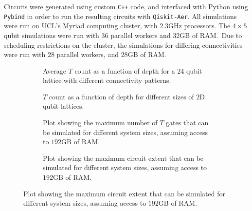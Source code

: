 Circuits were generated using custom \texttt{C++} code, and interfaced with Python using \texttt{Pybind} in order to run the resulting circuits with \texttt{Qiskit-Aer}. All simulations were run on UCL's Myriad computing cluster, with $2.3\mathrm{GHz}$ processors. The $4\times5$ qubit simulations were run with $36$ parallel workers and $32\mathrm{GB}$ of RAM.\ Due to scheduling restrictions on the cluster, the simulations for differing connectivities were run with $28$ parallel workers, and $28\mathrm{GB}$ of RAM.
\begin{figure}[H]
\centering
\caption{Resource Analysis of Google circuits on a $20$ qubit lattice.}\label{fig:rc_resources}
\begin{subfigure}[t]{0.48\textwidth}
\begin{scaletikzpicturetowidth}{\textwidth}

\end{scaletikzpicturetowidth}
\caption{Average $T$ count as a function of depth for a $24$ qubit lattice with different connectivity patterns.}\label{fig:t_count_depth}
\end{subfigure}
\begin{subfigure}[t]{0.48\textwidth}
\begin{scaletikzpicturetowidth}{\textwidth}

\end{scaletikzpicturetowidth}
\caption{$T$ count as a function of depth for different sizes of $2$D qubit lattices.}\label{fig:t_count_connectivity}
\end{subfigure}
\begin{subfigure}[t]{0.48\textwidth}
\begin{scaletikzpicturetowidth}{\textwidth}

\end{scaletikzpicturetowidth}
\caption{Plot showing the maximum number of $T$ gates that can be simulated for different system sizes, assuming access to $192\mathrm{GB}$ of RAM.}\label{fig:max_t_bar}
\end{subfigure}
\begin{subfigure}[t]{0.48\textwidth}
\begin{scaletikzpicturetowidth}{\textwidth}

\end{scaletikzpicturetowidth}
\caption{Plot showing the maximum circuit extent that can be simulated for different system sizes, assuming access to $192\mathrm{GB}$ of RAM.}\label{fig:max_extent_bar}
\end{subfigure}
\end{figure}
